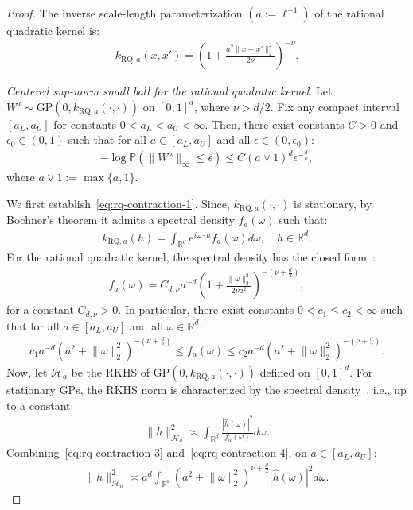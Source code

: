 \documentclass[final,12pt]{colt2026} %
\begin{document}
\begin{proof}
The inverse scale-length parameterization $(a:=\ell^{-1})$ of the rational quadratic kernel is:
\begin{align*}
k_{\mathrm{RQ}, a}(x, x') = \left(1 + \frac{a^{2}\lVert x - x'\rVert_{2}^{2}}{2\nu}\right)^{-\nu}.
\end{align*}

\medskip
\noindent\textit{Centered sup-norm small ball for the rational quadratic kernel}. Let $W^{a} \sim \mathrm{GP}(0, k_{\mathrm{RQ}, a}(\cdot, \cdot))$ on $[0, 1]^{d}$, where $\nu > d/2$. Fix any compact interval $[a_L, a_U]$ for constants $0<a_L<a_U<\infty$. Then, there exist constants $C>0$ and $\epsilon_0 \in (0, 1)$ such that for all $a\in [a_L, a_U]$ and all $\epsilon\in (0, \epsilon_0)$:
\begin{align}
\label{eq:rq-contraction-1}
-\log \mathbb{P}\left(\lVert W^{a}\rVert_{\infty} \leq \epsilon\right) \leq C (a\vee 1)^{d}\epsilon^{-\frac{d}{\nu}},
\end{align}
where $a\vee 1:=\max\{a, 1\}$.

We first establish~\eqref{eq:rq-contraction-1}. Since, $k_{\mathrm{RQ}, a}(\cdot,\cdot)$ is stationary, by Bochner's theorem it admits a spectral density $f_a(\omega)$ such that:
\begin{align*}
k_{\mathrm{RQ}, a}(h) = \int_{\mathbb{R}^{d}}e^{i\omega\cdot h}f_a(\omega)d\omega,\quad h\in \mathbb{R}^{d}.
\end{align*}
For the rational quadratic kernel, the spectral density has the closed form~\citep{Rasmussen-Williams-2005}:
\begin{align}
\label{eq:rq-contraction-2}
f_{a}(\omega) = C_{d, \nu}a^{-d}\left(1 + \frac{\lVert \omega \rVert_{2}^{2}}{2\nu a^{2}}\right)^{-(\nu + \frac{d}{2})},
\end{align}
for a constant $C_{d, \nu} > 0$. In particular, there exist constants $0<c_1 \leq c_2<\infty$ such that for all $a\in [a_L, a_U]$ and all $\omega \in \mathbb{R}^{d}$:
\begin{align}
\label{eq:rq-contraction-3}
c_1a^{-d}\left(a^{2} + \lVert \omega \rVert_{2}^{2}\right)^{-(\nu + \frac{d}{2})} \leq f_a(\omega) \leq c_2a^{-d}\left(a^{2} + \lVert \omega \rVert_{2}^{2}\right)^{-(\nu + \frac{d}{2})}.
\end{align}
Now, let $\mathcal{H}_a$ be the RKHS of $\mathrm{GP}(0, k_{\mathrm{RQ}, a}(\cdot, \cdot))$ defined on $[0, 1]^{d}$. For stationary GPs, the RKHS norm is characterized by the spectral density~\citep{vdv-vz-2008}, i.e., up to a constant:
\begin{align}
\label{eq:rq-contraction-4}
\lVert h\rVert_{\mathcal{H}_a}^{2} \asymp \int_{\mathbb{R}^{d}}\frac{|\widehat{h}(\omega)|^2}{f_a(\omega)}d\omega.
\end{align}
Combining~\eqref{eq:rq-contraction-3} and~\eqref{eq:rq-contraction-4}, on $a\in [a_L, a_U]$:
\begin{align}
\label{eq:rq-contraction-5}
\lVert h \rVert_{\mathcal{H}_a}^{2} \asymp a^{d}\int_{\mathbb{R}^{d}}\left(a^2 + \lVert \omega\rVert_2^{2}\right)^{\nu + \frac{d}{2}}|\widehat{h}(\omega)|^{2}d\omega.
\end{align}


\end{proof}
\end{document}
